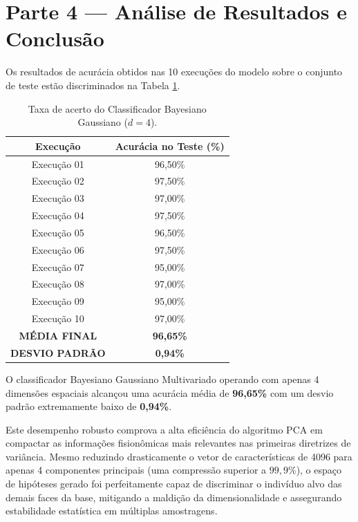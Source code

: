 \documentclass[12pt]{article}
\begin{document}
\section{Parte 4 — Análise de Resultados e Conclusão}

Os resultados de acurácia obtidos nas 10 execuções do modelo sobre o conjunto de teste estão discriminados na Tabela \ref{tab:bayes_results}.

\begin{table}[H]
\centering
\caption{Taxa de acerto do Classificador Bayesiano Gaussiano ($d = 4$).}
\label{tab:bayes_results}
\begin{tabular}{@{}cc@{}}
\toprule
\textbf{Execução} & \textbf{Acurácia no Teste (\%)} \\ \midrule
Execução 01 & 96,50\% \\
Execução 02 & 97,50\% \\
Execução 03 & 97,00\% \\
Execução 04 & 97,50\% \\
Execução 05 & 96,50\% \\
Execução 06 & 97,50\% \\
Execução 07 & 95,00\% \\
Execução 08 & 97,00\% \\
Execução 09 & 95,00\% \\
Execução 10 & 97,00\% \\ \midrule
\textbf{MÉDIA FINAL} & \textbf{96,65\%} \\
\textbf{DESVIO PADRÃO} & \textbf{0,94\%} \\ \bottomrule
\end{tabular}
\end{table}

O classificador Bayesiano Gaussiano Multivariado operando com apenas 4 dimensões espaciais alcançou uma acurácia média de \textbf{96,65\%} com um desvio padrão extremamente baixo de \textbf{0,94\%}. 

Este desempenho robusto comprova a alta eficiência do algoritmo PCA em compactar as informações fisionômicas mais relevantes nas primeiras diretrizes de variância. Mesmo reduzindo drasticamente o vetor de características de 4096 para apenas 4 componentes principais (uma compressão superior a $99,9\%$), o espaço de hipóteses gerado foi perfeitamente capaz de discriminar o indivíduo alvo das demais faces da base, mitigando a maldição da dimensionalidade e assegurando estabilidade estatística em múltiplas amostragens.
\end{document}
